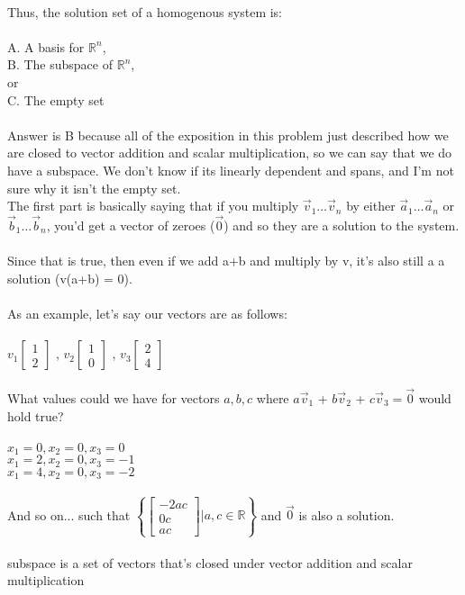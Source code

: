 \documentclass{article}
\begin{document}
\\
Thus, the solution set of a homogenous system is:\\
\\
A. A basis for $\mathbb{R}^{n}$,\\
B. The subspace of $\mathbb{R}^{n}$,\\
or\\
C. The empty set\\
\\
Answer is B because all of the exposition in this problem just described how we are closed to vector addition and scalar multiplication, so we can say that we do have a subspace. We don't know if its linearly dependent and spans, and I'm not sure why it isn't the empty set.
\\
The first part is basically saying that if you multiply $\vec{v}_{1} \dots \vec{v}_n$ by either $\vec{a}_{1} \dots \vec{a}_n$ or $\vec{b}_{1} \dots \vec{b}_n$, you'd get a vector of zeroes ($\vec{0}$) and so they are a solution to the system.\\
\\
Since that is true, then even if we add a+b and multiply by v, it's also still a a solution (v(a+b) = 0).\\
\\
As an example, let's say our vectors are as follows:\\
\\
$ v_{1} \left[ \begin{matrix} 1 \\ 2 \end{matrix}\right]$ ,
$ v_{2} \left[ \begin{matrix} 1 \\ 0 \end{matrix}\right]$ ,
$ v_{3} \left[ \begin{matrix} 2 \\ 4 \end{matrix}\right]$ \\
\\
What values could we have for vectors $a, b, c$ where  $a\vec{v}_{1}$ + $b\vec{v}_{2}$ + $c\vec{v}_{3} = \vec{0}$ would hold true?\\
\\
$x_{1} = 0, x_{2} = 0, x_{3} = 0$\\
$x_{1} = 2, x_{2} = 0, x_{3} = -1$\\
$x_{1} = 4, x_{2} = 0, x_{3} = -2$\\
\\
And so on... such that $ \left\{ \left[ \begin{matrix} -2ac \\ 0c \\ ac \end{matrix}\right] \Biggl| a,c \in \mathbb{R} \right\}$ and $\vec{0}$ is also a solution.\\
\\
subspace is a set of vectors that's closed under vector addition and scalar multiplication\\
\\
\end{document}
